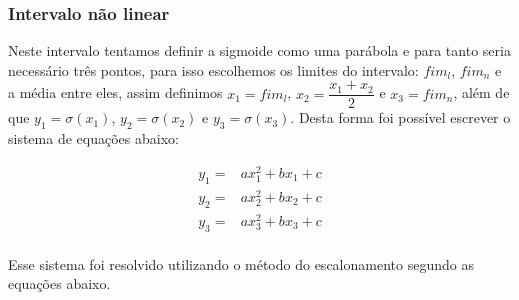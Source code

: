\documentclass{article}
\begin{document}
\subsubsection{Intervalo não linear}
Neste intervalo tentamos definir a sigmoide como uma parábola e para tanto seria necessário três pontos, para isso escolhemos os limites do intervalo: $fim_l$, $fim_n$ e a média entre eles, assim definimos $x_1 = fim_l$, $x_2 = \dfrac{x_1 + x_2}{2}$ e $x_3 = fim_n$, além de que $y_1 = \sigma(x_1)$, $y_2 = \sigma(x_2)$ e $y_3 = \sigma(x_3)$. Desta forma foi possível escrever o sistema de equações abaixo:

\begin{equation}
\begin{split}
    y_1 =& ax_1^2 + bx_1 + c \\
    y_2 =& ax_2^2 + bx_2 + c \\
    y_3 =& ax_3^2 + bx_3 + c \\
\end{split}
\end{equation}

Esse sistema foi resolvido utilizando o método do escalonamento segundo as equações abaixo.
\end{document}
